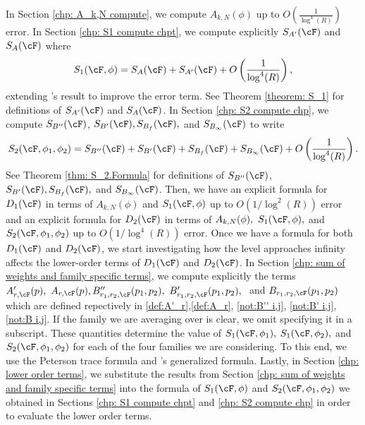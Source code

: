 \documentclass[11pt, reqno]{amsart}
\theoremstyle{definition}
\theoremstyle{remark}
\numberwithin{equation}{section}
\begin{document}
In Section \ref{chp: A_k,N compute}, we compute $A_{k,N}(\phi)$ up to $O\left(\frac{1}{\log^4(R) }\right)$ error. In Section \ref{chp: S1 compute chpt}, we compute explicitly $S_{A'}(\cF)$ and $S_{A}(\cF)$ where $$S_1(\cF,\phi) = S_A(\cF) + S_{A'}(\cF) + O\left(\frac{1}{\log^4(R)}\right),$$ extending \cite{Miller2009_LOTerms_1LevelDensity}'s result to improve the error term. See Theorem \ref{theorem: S_1} for definitions of $S_{A'}(\cF) $ and $S_{A}(\cF)$. In Section \ref{chp: S2 compute chp}, we compute $S_{B''}(\cF) $, $S_{B'}(\cF), S_{B_f}(\cF), $ and $S_{B_\infty}(\cF)$ to write $$S_2(\cF,\phi_1,\phi_2) =S_{B''}(\cF) +S_{B'}(\cF)+S_{B_f}(\cF)+S_{B_\infty}(\cF)+ O\left(\frac{1}{\log^4(R)}\right).$$ See Theorem \ref{thm: S_2.Formula} for definitions of $S_{B''}(\cF) $, $S_{B'}(\cF), S_{B_f}(\cF), $ and $S_{B_\infty}(\cF)$. Then, we have an explicit formula for $D_1(\cF)$ in terms of $A_{k,N}(\phi)$ and $S_1(\cF,\phi)$ up to $O\left(1/\log^2(R)\right)$ error and an explicit formula for $D_2(\cF)$ in terms of $A_{k,N}(\phi), ~ S_1(\cF,\phi),$ and $S_2(\cF,\phi_1,\phi_2)$ up to $O\left({1}/{\log^4(R)}\right)$ error. Once we have a formula for both $D_1(\cF)$ and $D_2(\cF)$, we start investigating how the level approaches infinity affects the lower-order terms of $D_1(\cF)$ and $D_2(\cF)$. In Section  \ref{chp: sum of weights and family specific terms}, we compute explicitly the terms $A'_{r,\cF}(p), \ A_{r,\cF}(p), B''_{r_1,r_2,\cF}(p_1,p_2), \ B'_{r_1,r_2,\cF}(p_1,p_2), \ $ and $B_{r_1,r_2,\cF}(p_1,p_2)$ which are defined repectively in \eqref{def:A'_r},\eqref{def:A_r}, \eqref{not:B'' i,j}, \eqref{not:B' i,j}, \eqref{not:B i,j}. If the family we are averaging over is clear, we omit specifying it in a subscript. These quantities determine the value of $S_1(\cF,\phi_1),$ $S_1(\cF,\phi_2),$ and $S_2(\cF,\phi_1,\phi_2)$ for each of the four families we are considering. To this end, we use the Peterson trace formula and \cite{BarrettEtAl2016arXiv}'s generalized formula. Lastly, in Section \ref{chp: lower order terms}, we substitute the results from Section \ref{chp: sum of weights and family specific terms} into the formula of $S_1(\cF,\phi)$ and $S_2(\cF,\phi_1,\phi_2)$ we obtained in Sections \ref{chp: S1 compute chpt} and \ref{chp: S2 compute chp} in order to evaluate the lower order terms. 
\end{document}
